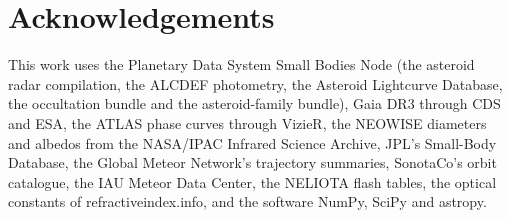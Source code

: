 \documentclass[3p,11pt]{elsarticle}
\begin{document}
\section*{Acknowledgements}

This work uses the Planetary Data System Small Bodies Node (the asteroid radar
compilation, the ALCDEF photometry, the Asteroid Lightcurve Database, the occultation
bundle and the asteroid-family bundle), Gaia DR3 through CDS and ESA, the ATLAS phase
curves through VizieR, the NEOWISE diameters and albedos from the NASA/IPAC Infrared
Science Archive, JPL's Small-Body Database, the Global Meteor Network's trajectory
summaries, SonotaCo's orbit catalogue, the IAU Meteor Data Center, the NELIOTA flash
tables, the optical constants of refractiveindex.info, and the software NumPy, SciPy and
astropy.
\end{document}
